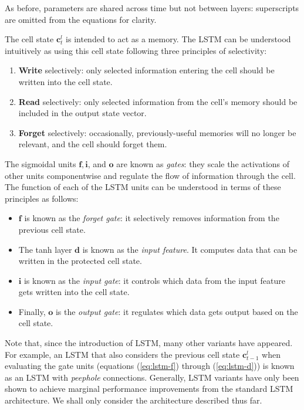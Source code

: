 \documentclass[12pt,a4paper,twoside,openright]{report}
\newcommand{\vect}[1]{\boldsymbol{\mathbf{#1}}}
\begin{document}
As before, parameters are shared across time but not between layers:
superscripts are omitted from the equations for clarity.

The cell state $\vect{c}_t^l$ is intended to act as a memory. The LSTM can be
understood intuitively as using this cell state following three principles of
selectivity:
\begin{enumerate}[label=\arabic*., itemsep=0mm]
  \item \textbf{Write} selectively: only selected information entering the cell
    should be written into the cell state.
  \item \textbf{Read} selectively: only selected information from the cell's
    memory should be included in the output state vector.
  \item \textbf{Forget} selectively: occasionally, previously-useful memories
    will no longer be relevant, and the cell should forget them.
\end{enumerate}

The sigmoidal units $\vect{f}, \vect{i}$, and $\vect{o}$ are known as
\emph{gates}: they scale the activations of other units componentwise and
regulate the flow of information through the cell. The function of each of the
LSTM units can be understood in terms of these principles as follows:

\begin{itemize}
  \item $\vect{f}$ is known as the \emph{forget gate}: it selectively removes
    information from the previous cell state.
  \item The tanh layer $\vect{d}$ is known as the \emph{input feature}. It
    computes data that can be written in the protected cell state.
\item $\vect{i}$ is known as the \emph{input gate}: it controls which data from
  the input feature gets written into the cell state.
\item Finally, $\vect{o}$ is the \emph{output gate}: it regulates which data
  gets output based on the cell state.
\end{itemize}

Note that, since the introduction of LSTM, many other variants have appeared.
For example, an LSTM that also considers the previous cell state
$\vect{c}_{t-1}^l$ when evaluating the gate units (equations (\ref{eq:lstm-f})
through (\ref{eq:lstm-d})) is known as an LSTM with \emph{peephole} connections.
Generally, LSTM variants have only been shown to achieve marginal performance
improvements from the standard LSTM architecture. We shall only consider the
architecture described thus far.
\end{document}

